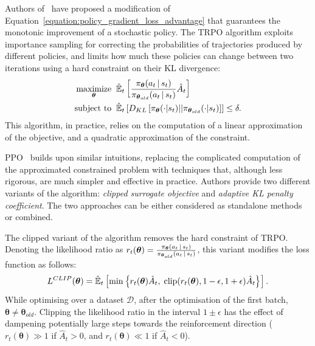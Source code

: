 Authors of~\parencite{schulman_trust_2017} have proposed 
a modification of Equation~\eqref{equation:policy_gradient_loss_advantage} that guarantees the monotonic improvement of a stochastic policy.
The \ac{TRPO} algorithm exploits importance sampling for correcting the probabilities of trajectories produced by different policies, and limits how much these policies can change between two iterations using a hard constraint on their \ac{KL} divergence:
%
\begin{align*}
    \mathop{\text{maximize}}_{\boldsymbol{\theta}} \;\; & \hat{\operatorname*{\mathbb{E}}}_t \left[ \frac{\pi_{\boldsymbol{\theta}}(a_t \operatorname{\mid} s_t)}{\pi_{\boldsymbol{\theta}_{old}}(a_t \operatorname{\mid} s_t)} \hat{A}_t \right] \\
    \text{subject to} \;\; & \hat{\operatorname*{\mathbb{E}}}_t \left[ D_{KL}\left[\pi_{\boldsymbol{\theta}}(\cdot|s_t) || \pi_{\boldsymbol{\theta}_{old}}(\cdot|s_t)\right] \right] \leq \delta.
\end{align*}
%
This algorithm, in practice, relies on the computation of a linear approximation of the objective, and a quadratic approximation of the constraint.

\ac{PPO}~\parencite{schulman_proximal_2017} builds upon similar intuitions,
replacing the complicated computation of the approximated constrained problem with techniques that, although less rigorous, are much simpler and effective in practice.
Authors provide two different variants of the algorithm: \emph{clipped surrogate objective} and \emph{adaptive KL penalty coefficient}.
The two approaches can be either considered as standalone methods or combined.

The clipped variant of the algorithm removes the hard constraint of \acs{TRPO}.
Denoting the likelihood ratio as $r_t(\boldsymbol{\theta}) = \frac{\pi_{\boldsymbol{\theta}}(a_t \operatorname{\mid} s_t)}{\pi_{\boldsymbol{\theta}_{old}}(a_t \operatorname{\mid} s_t)}$, this variant modifies the loss function as follows:
%
\begin{equation*}
    L^{CLIP}(\boldsymbol{\theta}) = \hat{\operatorname*{\mathbb{E}}}_t \left[ \min \left\{ r_t(\boldsymbol{\theta}) \hat{A}_t, \; \operatorname{clip} (r_t(\boldsymbol{\theta}), 1 - \epsilon, 1+\epsilon) \hat{A}_t \right\} \right] .
\end{equation*}
%
While optimising over a dataset $\mathcal{D}$, after the optimisation of the first batch, $\boldsymbol{\theta} \neq \boldsymbol{\theta}_{old}$.
Clipping the likelihood ratio in the interval $1 \pm \epsilon$ has the effect of dampening potentially large steps towards the reinforcement direction ($r_t(\boldsymbol{\theta}) \gg 1$ if $\hat{A}_t>0$, and $r_t(\boldsymbol{\theta}) \ll 1$ if $\hat{A}_t < 0$).

